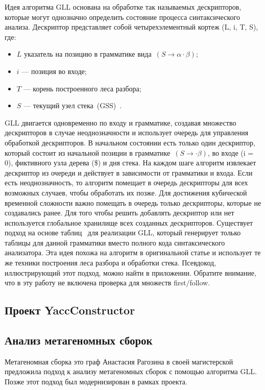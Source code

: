 \documentclass[14pt]{matmex-diploma-custom}
\begin{document}
	Идея алгоритма GLL основана на обработке так называемых дескрипторов, которые 
	могут однозначно определить состояние процесса синтаксического анализа. Дескриптор
	представляет собой четырехэлементный кортеж (L, i, T, S), где:
	\begin{itemize}
		\item $L$ указатель на позицию в грамматике вида~$(S \to \alpha \cdot \beta)$;
		\item $i$ --- позиция во входе;
		\item $T$ --- корень построенного леса разбора;
		\item $S$ --- текущий узел стека~(GSS)~\cite{afroozeh2015faster}.
	\end{itemize}
	
	GLL двигается одновременно по входу и грамматике, создавая множество дескрипторов
	в случае неоднозначности и использует очередь для управления обработкой дескрипторов.
	В начальном состоянии есть только один дескриптор, который состоит из начальной 
	позиции в грамматике~$(S \to \cdot \beta)$, во входе (i = 0), фиктивного узла дерева (\$)
	и дня стека. На каждом шаге алгоритм извлекает дескриптор из очереди и действует
	в зависимости от грамматики и входа. Если есть неоднозначность, то алгоритм помещает
	в очередь дескрипторы для всех возможных случаев, чтобы обработать их позже. 
	Для достижения кубической временной сложности важно помещать в очередь только дескрипторы,
	которые не создавались ранее. Для того чтобы решить добавлять дескриптор или нет
	используется глобальное хранилище всех созданных дескрипторов.
	Существует подход на основе таблиц~\cite{ragozina} для реализации GLL, который генерирует
	только таблицы для данной грамматики вместо полного кода синтаксического анализатора.
	Эта идея похожа на алгоритм в оригинальной статье и использует те же техники
	построения леса разбора и обработки стека. Псевдокод, иллюстрирующий этот подход, 
	можно найти в приложении. Обратите внимание, что в эту работу не включена
	проверка для множеств first/follow.
	
	\subsection{Проект YaccConstructor}
	
	\subsection{Анализ метагеномных сборок}
	
	
	Метагеномная сборка это граф
	Анастасия Рагозина в своей магистерской предложила подход к анализу метагеномных
	сборок с помощью алгоритма GLL. Позже этот подход был модернизирован в рамках проекта.
	
\end{document}
